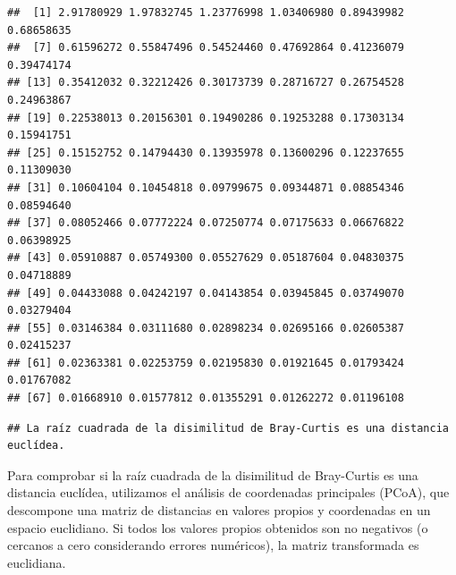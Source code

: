 \documentclass[
]{article}
\newenvironment{Shaded}{\begin{snugshade}}{\end{snugshade}}
\newcommand{\CommentTok}[1]{\textcolor[rgb]{0.56,0.35,0.01}{\textit{#1}}}
\newcommand{\ControlFlowTok}[1]{\textcolor[rgb]{0.13,0.29,0.53}{\textbf{#1}}}
\newcommand{\FloatTok}[1]{\textcolor[rgb]{0.00,0.00,0.81}{#1}}
\newcommand{\FunctionTok}[1]{\textcolor[rgb]{0.13,0.29,0.53}{\textbf{#1}}}
\newcommand{\NormalTok}[1]{#1}
\newcommand{\SpecialCharTok}[1]{\textcolor[rgb]{0.81,0.36,0.00}{\textbf{#1}}}
\newcommand{\StringTok}[1]{\textcolor[rgb]{0.31,0.60,0.02}{#1}}
\begin{document}
\begin{verbatim}
##  [1] 2.91780929 1.97832745 1.23776998 1.03406980 0.89439982 0.68658635
##  [7] 0.61596272 0.55847496 0.54524460 0.47692864 0.41236079 0.39474174
## [13] 0.35412032 0.32212426 0.30173739 0.28716727 0.26754528 0.24963867
## [19] 0.22538013 0.20156301 0.19490286 0.19253288 0.17303134 0.15941751
## [25] 0.15152752 0.14794430 0.13935978 0.13600296 0.12237655 0.11309030
## [31] 0.10604104 0.10454818 0.09799675 0.09344871 0.08854346 0.08594640
## [37] 0.08052466 0.07772224 0.07250774 0.07175633 0.06676822 0.06398925
## [43] 0.05910887 0.05749300 0.05527629 0.05187604 0.04830375 0.04718889
## [49] 0.04433088 0.04242197 0.04143854 0.03945845 0.03749070 0.03279404
## [55] 0.03146384 0.03111680 0.02898234 0.02695166 0.02605387 0.02415237
## [61] 0.02363381 0.02253759 0.02195830 0.01921645 0.01793424 0.01767082
## [67] 0.01668910 0.01577812 0.01355291 0.01262272 0.01196108
\end{verbatim}

\begin{Shaded}
\end{Shaded}

\begin{verbatim}
## La raíz cuadrada de la disimilitud de Bray-Curtis es una distancia euclídea.
\end{verbatim}

Para comprobar si la raíz cuadrada de la disimilitud de Bray-Curtis es
una distancia euclídea, utilizamos el análisis de coordenadas
principales (PCoA), que descompone una matriz de distancias en valores
propios y coordenadas en un espacio euclidiano. Si todos los valores
propios obtenidos son no negativos (o cercanos a cero considerando
errores numéricos), la matriz transformada es euclidiana.
\end{document}
